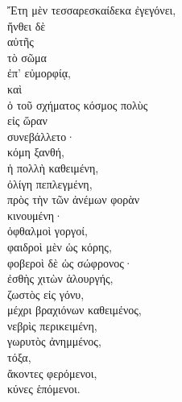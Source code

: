 {\large
\begin{greek}
\noindent Ἔτη μὲν τεσσαρεσκαίδεκα ἐγεγόνει, \\
ἤνθει δὲ \\
\tabto{2em} αὐτῆς \\
τὸ σῶμα \\
\tabto{2em} ἐπ' εὐμορφίᾳ,\\
καὶ\\
ὁ τοῦ σχήματος κόσμος πολὺς \\
εἰς ὥραν \\
συνεβάλλετο·\\
κόμη ξανθή, \\
\tabto{2em} ἡ πολλὴ καθειμένη, \\
\tabto{2em} ὀλίγη πεπλεγμένη, \\
\tabto{4em} πρὸς τὴν τῶν ἀνέμων φορὰν \\
\tabto{4em} κινουμένη· \\
ὀφθαλμοὶ γοργοί, \\
\tabto{2em} φαιδροὶ μὲν ὡς κόρης, \\
\tabto{2em} φοβεροὶ δὲ ὡς σώφρονος·\\
ἐσθὴς χιτὼν ἁλουργής, \\
\tabto{2em} ζωστὸς εἰς γόνυ, \\
\tabto{2em} μέχρι βραχιόνων καθειμένος,\\
νεβρὶς περικειμένη, \\
γωρυτὸς ἀνημμένος, \\
τόξα, \\
ἄκοντες φερόμενοι, \\
κύνες ἑπόμενοι. \\

\end{greek}
}

